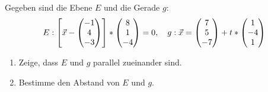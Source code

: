 Gegeben sind die Ebene $E$ und die Gerade $g$:
\begin{equation*}
	E: \left[ \vec x -  \begin{pmatrix} -1 \\ 4\\ -3 \end{pmatrix}\right]*\begin{pmatrix} 8\\ 1 \\-4 \end{pmatrix}=0,\quad
	g: \vec x=\begin{pmatrix} 7\\5\\-7 \end{pmatrix}+t*\begin{pmatrix} 1\\-4\\1 \end{pmatrix}
\end{equation*}
\begin{enumerate}
	\item Zeige, dass $E$ und $g$ parallel zueinander sind.
	\item Bestimme den Abstand von $E$ und $g$.
\end{enumerate}

